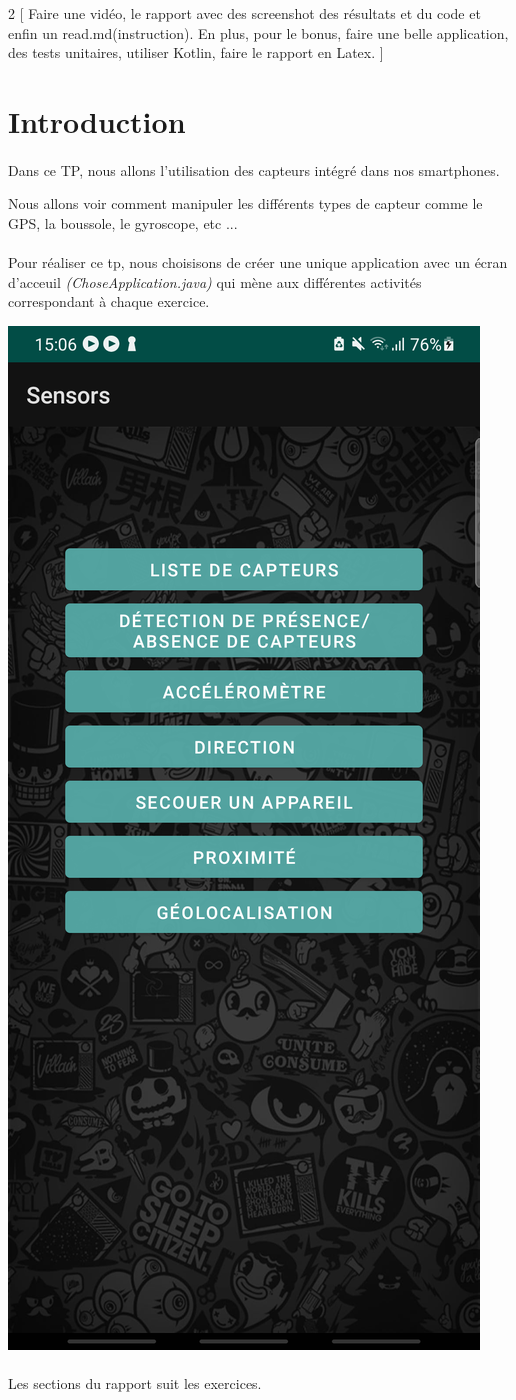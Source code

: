 \documentclass[a4paper]{article}
\begin{document}
    \newpage
    \begin{multicols}{2}
        [
            Faire une vidéo, le rapport avec des screenshot des résultats et du code et enfin un read.md(instruction). En plus, pour le bonus, faire une belle application, des tests unitaires, utiliser Kotlin, faire le rapport en Latex.
        ]
        \section*{Introduction}
        \paragraph{}
            Dans ce TP, nous allons l'utilisation des capteurs intégré dans nos smartphones.
            
            Nous allons voir comment manipuler les différents types de capteur comme le GPS, la boussole, le gyroscope, etc ...
        \paragraph{}
            Pour réaliser ce tp, nous choisisons de créer une unique application avec un écran d'acceuil \emph{(ChoseApplication.java)} qui mène aux différentes activités correspondant à chaque exercice.
            
            \includegraphics[height=.8\textwidth]{screenshot}
        \paragraph{}
            Les sections du rapport suit les exercices.

\end{multicols}
\end{document}
